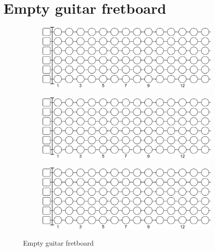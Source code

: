 \chapter{Empty guitar fretboard} \label{chap:empty_guitar_fretboard}

\begin{figure}[h]
	\begin{subfigure}[b]{\textwidth}
		\centering
		\includegraphics[width=\textwidth]{../../Images/guitar_empty_fretboard.png}
	\end{subfigure}
	
	\vspace{0.6cm}
	
	\begin{subfigure}[b]{\textwidth}
		\centering
		\includegraphics[width=\textwidth]{../../Images/guitar_empty_fretboard.png}
	\end{subfigure}
	
	\vspace{0.6cm}

	\begin{subfigure}[b]{\textwidth}
		\centering
		\includegraphics[width=\textwidth]{../../Images/guitar_empty_fretboard.png}
	\end{subfigure}
	
	\caption{Empty guitar fretboard}
	\label{fig:guitar_empty_fretboard}
\end{figure}